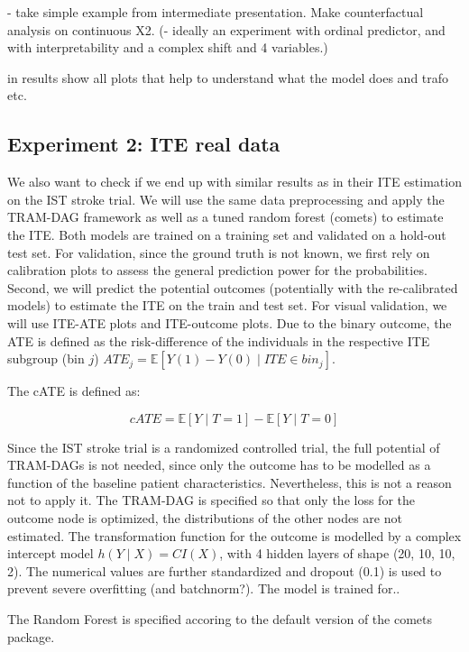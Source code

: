 - take simple example from intermediate presentation. Make counterfactual analysis on continuous X2.
(- ideally an experiment with ordinal predictor, and with interpretability and a complex shift and 4 variables.)

in results show all plots that help to understand what the model does and trafo etc.

\subsection{Experiment 2: ITE real data} \label{sec:methods_experiment2}

We also want to check if we end up with similar results as \citet{chen2025} in their ITE estimation on the IST stroke trial. We will use the same data preprocessing and apply the TRAM-DAG framework as well as a tuned random forest (comets) to estimate the ITE. Both models are trained on a training set and validated on a hold-out test set. For validation, since the ground truth is not known, we first rely on calibration plots to assess the general prediction power for the probabilities. Second, we will predict the potential outcomes (potentially with the re-calibrated models) to estimate the ITE on the train and test set. For visual validation, we will use ITE-ATE plots and ITE-outcome plots. Due to the binary outcome, the ATE is defined as the risk-difference of the individuals in the respective ITE subgroup (bin $j$) $ATE_j = \mathbb{E}[Y(1) - Y(0) \mid ITE \in bin_j]$.

The cATE is defined as:

\begin{equation}
cATE = \mathbb{E}[Y \mid T = 1] - \mathbb{E}[Y \mid T = 0]
\end{equation}

Since the IST stroke trial is a randomized controlled trial, the full potential of TRAM-DAGs is not needed, since only the outcome has to be modelled as a function of the baseline patient characteristics. Nevertheless, this is not a reason not to apply it. The TRAM-DAG is specified so that only the loss for the outcome node is optimized, the distributions of the other nodes are not estimated. The transformation function for the outcome is modelled by a complex intercept model $h(Y \mid X) = CI(X)$, with 4 hidden layers of shape (20, 10, 10, 2). The numerical values are further standardized and dropout (0.1) is used to prevent severe overfitting (and batchnorm?). The model is trained for..

The Random Forest is specified accoring to the default version of the comets package.

